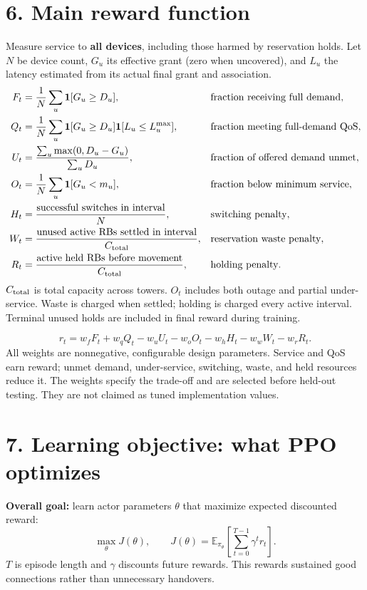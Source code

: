 \documentclass[10pt,a4paper]{article}
\newcommand{\ind}{\mathbf 1}
\begin{document}
\section*{6. Main reward function}
Measure service to \textbf{all devices}, including those harmed by reservation holds. Let $N$ be device count, $G_u$ its effective grant (zero when uncovered), and $L_u$ the latency estimated from its actual final grant and association.
\begin{align}
F_t&=\frac1N\sum_u\ind[G_u\ge D_u], & &\text{fraction receiving full demand},\\
Q_t&=\frac1N\sum_u\ind[G_u\ge D_u]\ind[L_u\le L_u^{\max}],
& &\text{fraction meeting full-demand QoS},\\
U_t&=\frac{\sum_u\max(0,D_u-G_u)}{\sum_uD_u},
& &\text{fraction of offered demand unmet},\\
O_t&=\frac1N\sum_u\ind[G_u<m_u], & &\text{fraction below minimum service},\\
H_t&=\frac{\text{successful switches in interval}}{N}, & &\text{switching penalty},\\
W_t&=\frac{\text{unused active RBs settled in interval}}{C_{\rm total}},
& &\text{reservation waste penalty},\\
R_t&=\frac{\text{active held RBs before movement}}{C_{\rm total}},
& &\text{holding penalty}.
\end{align}
$C_{\rm total}$ is total capacity across towers. $O_t$ includes both outage and partial under-service. Waste is charged when settled; holding is charged every active interval. Terminal unused holds are included in final reward during training.

\begin{equation}
\boxed{r_t=w_fF_t+w_qQ_t-w_uU_t-w_oO_t-w_hH_t-w_wW_t-w_rR_t.}
\end{equation}
All weights are nonnegative, configurable design parameters. Service and QoS earn reward; unmet demand, under-service, switching, waste, and held resources reduce it. The weights specify the trade-off and are selected before held-out testing. They are not claimed as tuned implementation values.

\section*{7. Learning objective: what PPO optimizes}
\textbf{Overall goal:} learn actor parameters $\theta$ that maximize expected discounted reward:
\begin{equation}
\max_\theta J(\theta),\qquad
J(\theta)=\mathbb E_{\pi_\theta}\left[\sum_{t=0}^{T-1}\gamma^t r_t\right].
\end{equation}
$T$ is episode length and $\gamma$ discounts future rewards. This rewards sustained good connections rather than unnecessary handovers.
\end{document}

